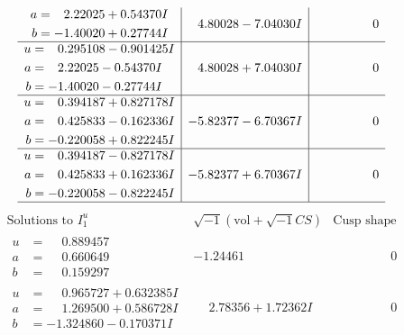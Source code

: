 \documentclass[1p]{elsarticle_modified}
\theoremstyle{definition}
\newcommand{\I}{\sqrt{-1}}
\begin{document}
$$\begin{array}{c|c|c}
\begin{aligned}
a &= \phantom{-}2.22025 + 0.54370 I \\
b &= -1.40020 + 0.27744 I\end{aligned}
 & \phantom{-}4.80028 - 7.04030 I & \phantom{-0.000000 } 0 \\ \hline\begin{aligned}
u &= \phantom{-}0.295108 - 0.901425 I \\
a &= \phantom{-}2.22025 - 0.54370 I \\
b &= -1.40020 - 0.27744 I\end{aligned}
 & \phantom{-}4.80028 + 7.04030 I & \phantom{-0.000000 } 0 \\ \hline\begin{aligned}
u &= \phantom{-}0.394187 + 0.827178 I \\
a &= \phantom{-}0.425833 - 0.162336 I \\
b &= -0.220058 + 0.822245 I\end{aligned}
 & -5.82377 - 6.70367 I & \phantom{-0.000000 } 0 \\ \hline\begin{aligned}
u &= \phantom{-}0.394187 - 0.827178 I \\
a &= \phantom{-}0.425833 + 0.162336 I \\
b &= -0.220058 - 0.822245 I\end{aligned}
 & -5.82377 + 6.70367 I & \phantom{-0.000000 } 0\\
 \hline 
 \end{array}$$\newpage$$\begin{array}{c|c|c}  
\text{Solutions to }I^u_{1}& \I (\text{vol} + \sqrt{-1}CS) & \text{Cusp shape}\\
 \hline 
\begin{aligned}
u &= \phantom{-}0.889457\phantom{ +0.000000I} \\
a &= \phantom{-}0.660649\phantom{ +0.000000I} \\
b &= \phantom{-}0.159297\phantom{ +0.000000I}\end{aligned}
 & -1.24461\phantom{ +0.000000I} & \phantom{-0.000000 } 0 \\ \hline\begin{aligned}
u &= \phantom{-}0.965727 + 0.632385 I \\
a &= \phantom{-}1.269500 + 0.586728 I \\
b &= -1.324860 - 0.170371 I\end{aligned}
 & \phantom{-}2.78356 + 1.72362 I & \phantom{-0.000000 } 0 \\ \hline\begin{aligned}

\end{aligned}
\end{array}$$
\end{document}
